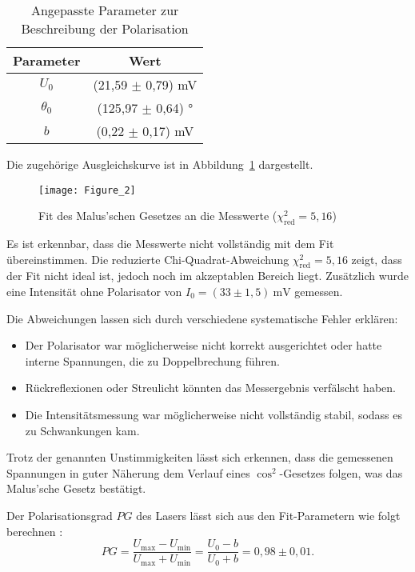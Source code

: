 \begin{table}[htbp]
    \centering
    \begin{tabular}{c|c}
        Parameter & Wert \\
        \hline
        $U_0$ & (21{,}59 \(\pm\) 0{,}79) mV \\
        $\theta_0$ & (125{,}97 \(\pm\) 0{,}64) ° \\
        $b$ & (0{,}22 \(\pm\) 0{,}17) mV \\
    \end{tabular}
    \caption{Angepasste Parameter zur Beschreibung der Polarisation}
    \label{tab:WertePol}
\end{table}

Die zugehörige Ausgleichskurve ist in Abbildung~\ref{fig:PolarisationFigur} dargestellt.

\begin{figure}[H]
    \centering
    \texttt{[image: Figure\_2]}
    \caption{Fit des Malus’schen Gesetzes an die Messwerte ($\chi^2_\text{red} = 5{,}16$)}
    \label{fig:PolarisationFigur}
\end{figure}

Es ist erkennbar, dass die Messwerte nicht vollständig mit dem Fit übereinstimmen.
Die reduzierte Chi-Quadrat-Abweichung $\chi^2_\text{red} = 5{,}16$ zeigt, dass der Fit nicht ideal ist, jedoch noch im akzeptablen Bereich liegt. 
Zusätzlich wurde eine Intensität ohne Polarisator von $I_0 = (33 \pm 1{,}5)~\text{mV}$ gemessen.

Die Abweichungen lassen sich durch verschiedene systematische Fehler erklären:

\begin{itemize}
    \item Der Polarisator war möglicherweise nicht korrekt ausgerichtet oder hatte interne Spannungen, die zu Doppelbrechung führen.
    \item Rückreflexionen oder Streulicht könnten das Messergebnis verfälscht haben.
    \item Die Intensitätsmessung war möglicherweise nicht vollständig stabil, sodass es zu Schwankungen kam.
\end{itemize}

Trotz der genannten Unstimmigkeiten lässt sich erkennen, dass die gemessenen Spannungen in guter Näherung dem Verlauf eines $\cos^2$-Gesetzes folgen, was das Malus’sche Gesetz bestätigt.

Der Polarisationsgrad \( PG \) des Lasers lässt sich aus den Fit-Parametern wie folgt berechnen \cite{praktikum}:
\begin{equation*}
    PG = \frac{U_\text{max} - U_\text{min}}{U_\text{max} + U_\text{min}} = \frac{U_0 - b}{U_0 + b} = 0{,}98 \pm 0{,}01.
\end{equation*}

